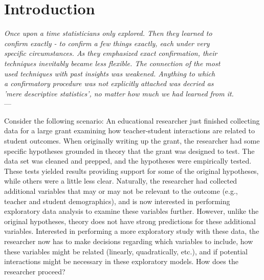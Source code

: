 
\chapter{Introduction} %

\label{ch:introduction} %


\begin{flushleft}{\slshape    
Once upon a time statisticians only explored. Then they learned to \\
confirm exactly - to confirm a few things exactly, each under very \\
specific circumstances. As they emphasized exact confirmation, their \\
techniques inevitably became less flexible. The connection of the most \\
used techniques with past insights was weakened. Anything to which \\
a confirmatory procedure was not explicitly attached was decried as \\
'mere descriptive statistics', no matter how much we had learned from it.} \\ \medskip
--- 
\end{flushleft}

\bigskip

Consider the following scenario: An educational researcher just finished collecting data for a large grant examining how teacher-student interactions are related to student outcomes. When originally writing up the grant, the researcher had some specific hypotheses grounded in theory that the grant was designed to test. The data set was cleaned and prepped, and the hypotheses were empirically tested. These tests yielded results providing support for some of the original hypotheses, while others were a little less clear. Naturally, the researcher had collected additional variables that may or may not be relevant to the outcome (e.g., teacher and student demographics), and is now interested in performing exploratory data analysis to examine these variables further. However, unlike the original hypotheses, theory does not have strong predictions for these additional variables. Interested in performing a more exploratory study with these data, the researcher now has to make decisions regarding which variables to include, how these variables might be related (linearly, quadratically, etc.), and if potential interactions might be necessary in these exploratory models. How does the researcher proceed?


